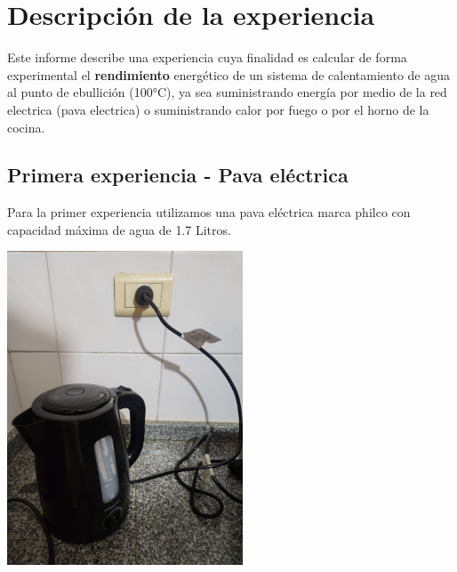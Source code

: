 \documentclass[]{article}
\begin{document}
\section{Descripción de la experiencia}
\begin{flushleft}
	Este informe describe una experiencia cuya finalidad es calcular de forma experimental el \textbf{rendimiento} energético de un sistema de calentamiento de agua al punto de ebullición (100°C), ya sea suministrando energía por medio de la red electrica (pava electrica) o suministrando calor por fuego o por el horno de la cocina.
\end{flushleft}

\subsection{Primera experiencia - Pava eléctrica}

\begin{flushleft}
	Para la primer experiencia utilizamos una pava eléctrica marca philco
	con capacidad máxima de agua de 1.7 Litros.
\end{flushleft}
\begin{center}
	\includegraphics[width=7cm]{pava1.jpg}
\end{center}

\newpage
\end{document}
